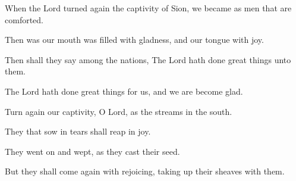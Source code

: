 When the Lord turned again the captivity of Sion, we became as men that are comforted.

Then was our mouth was filled with gladness, and our tongue with joy.

Then shall they say among the nations, The Lord hath done great things unto them.

The Lord hath done great things for us, and we are become glad.

Turn again our captivity, O Lord, as the streams in the south.

They that sow in tears shall reap in joy.

They went on and wept, as they cast their seed.

But they shall come again with rejoicing, taking up their sheaves with them.
